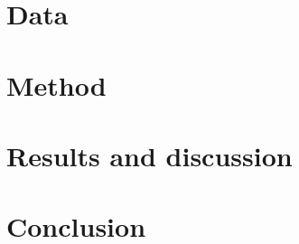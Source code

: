 \documentclass{report}
\begin{document}
\chapter{Data}


\chapter{Method}


\chapter{Results and discussion}


\chapter{Conclusion}
\vspace{-1cm}


\begin{appendices}

\end{appendices}

\listoffigures
\listoftables


 
\end{document}
